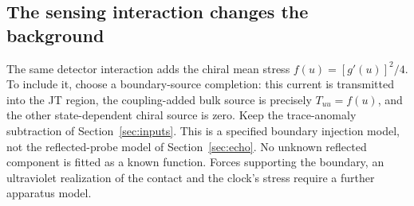 \subsection{The sensing interaction changes the background}
\label{sec:driven-boundary-sensor}

The same detector interaction adds the chiral mean stress
$f(u)=[g'(u)]^2/4$. To include it, choose a boundary-source completion:
this current is transmitted into the JT region, the coupling-added bulk source
is precisely $T_{uu}=f(u)$, and the other state-dependent chiral source is zero.
Keep the trace-anomaly subtraction of Section~\ref{sec:inputs}.
This is a specified boundary injection model, not the reflected-probe model of
Section~\ref{sec:echo}. No unknown reflected component is fitted as a known
function. Forces supporting the boundary, an ultraviolet realization of the
contact and the clock's stress require a further apparatus model.


